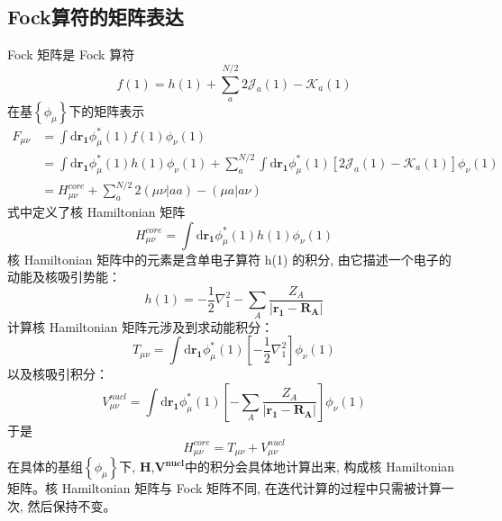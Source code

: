 \documentclass[]{article}
\begin{document}
\subsection{Fock算符的矩阵表达}
Fock 矩阵是 Fock 算符
\begin{equation}
	f(1)=h(1)+\sum\limits_{a}^{N/2}2\mathscr{J}_a(1)-\mathscr{K}_a(1)
\end{equation}
在基$\left\lbrace\phi_{\mu}\right\rbrace  $下的矩阵表示
\begin{align}
	F_{\mu\nu}
	&=\int\mathrm{d}\mathbf{r_1}\phi^*_{\mu}(1)f(1)\phi_{\nu}(1)\nonumber\\
	&=\int\mathrm{d}\mathbf{r_1}\phi^*_{\mu}(1)h(1)\phi_{\nu}(1)+\sum\limits_a^{N/2}\int\mathrm{d}\mathbf{r_1}\phi^*_{\mu}(1)[2\mathscr{J}_a(1)-\mathscr{K}_a(1)]\phi_{\nu}(1)\nonumber\\
	&=H^{core}_{\mu\nu}+\sum\limits_a^{N/2}2(\mu\nu|aa)-(\mu a|a\nu)
\end{align}
式中定义了核 Hamiltonian 矩阵
\begin{equation}
	H^{core}_{\mu\nu}=\int\mathrm{d}\mathbf{r_1}\phi^*_{\mu}(1)h(1)\phi_{\nu}(1)
\end{equation}
核 Hamiltonian 矩阵中的元素是含单电子算符 h(1) 的积分, 由它描述一个电子的动能及核吸引势能：
\begin{equation}
	h(1)=-\frac{1}{2}\nabla^2_1-\sum\limits_A\dfrac{Z_A}{|\mathbf{r_1}-\mathbf{R_A}|}
\end{equation}
计算核 Hamiltonian 矩阵元涉及到求动能积分：
\begin{equation}
	T_{\mu\nu}=\int\mathrm{d}\mathbf{r_1}\phi^*_{\mu}(1)\left[ -\frac{1}{2}\nabla^2_1\right] \phi_{\nu}(1)
\end{equation}
以及核吸引积分：
\begin{equation}
	V^{nucl}_{\mu\nu}=\int\mathrm{d}\mathbf{r_1}\phi^*_{\mu}(1)\left[ -\sum\limits_A\dfrac{Z_A}{|\mathbf{r_1}-\mathbf{R_A}|}\right] \phi_{\nu}(1)
\end{equation}
于是
\begin{equation}
	H^{core}_{\mu\nu}=T_{\mu\nu}+V^{nucl}_{\mu\nu}
\end{equation}
在具体的基组$\left\lbrace\phi_{\mu}\right\rbrace  $下, $\mathbf{H}$,$\mathbf{V^{nucl}}$中的积分会具体地计算出来, 构成核 Hamiltonian矩阵。核 Hamiltonian 矩阵与 Fock 矩阵不同, 在迭代计算的过程中只需被计算一次, 然后保持不变。
\end{document}
